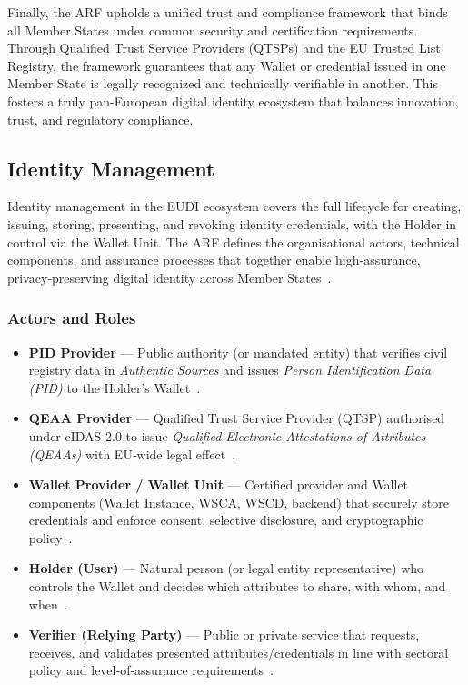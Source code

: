 \documentclass[sigconf,balance,nonacm,authordraft]{acmart}
\begin{document}
Finally, the ARF upholds a unified trust and compliance framework that binds all Member States under common security and certification requirements. Through Qualified Trust Service Providers (QTSPs) and the EU Trusted List Registry, the framework guarantees that any Wallet or credential issued in one Member State is legally recognized and technically verifiable in another. This fosters a truly pan-European digital identity ecosystem that balances innovation, trust, and regulatory compliance.


\subsection{Identity Management}

Identity management in the EUDI ecosystem covers the full lifecycle for creating, issuing, storing, presenting, and revoking identity credentials, with the Holder in control via the Wallet Unit. The ARF defines the organisational actors, technical components, and assurance processes that together enable high‑assurance, privacy‑preserving digital identity across Member States~\cite{EU_ARF2024}.

\subsubsection*{Actors and Roles}
\begin{itemize}
  \item \textbf{PID Provider} — Public authority (or mandated entity) that verifies civil registry data in \textit{Authentic Sources} and issues \textit{Person Identification Data (PID)} to the Holder's Wallet~\cite{EU_ARF2024}.
  \item \textbf{QEAA Provider} — Qualified Trust Service Provider (QTSP) authorised under eIDAS 2.0 to issue \textit{Qualified Electronic Attestations of Attributes (QEAAs)} with EU‑wide legal effect~\cite{EU_eIDAS2024}.
  \item \textbf{Wallet Provider / Wallet Unit} — Certified provider and Wallet components (Wallet Instance, WSCA, WSCD, backend) that securely store credentials and enforce consent, selective disclosure, and cryptographic policy~\cite{EU_ARF2024}.
  \item \textbf{Holder (User)} — Natural person (or legal entity representative) who controls the Wallet and decides which attributes to share, with whom, and when~\cite{EU_ARF2024}.
  \item \textbf{Verifier (Relying Party)} — Public or private service that requests, receives, and validates presented attributes/credentials in line with sectoral policy and level‑of‑assurance requirements~\cite{EU_ARF2024}.
\end{itemize}
\end{document}
